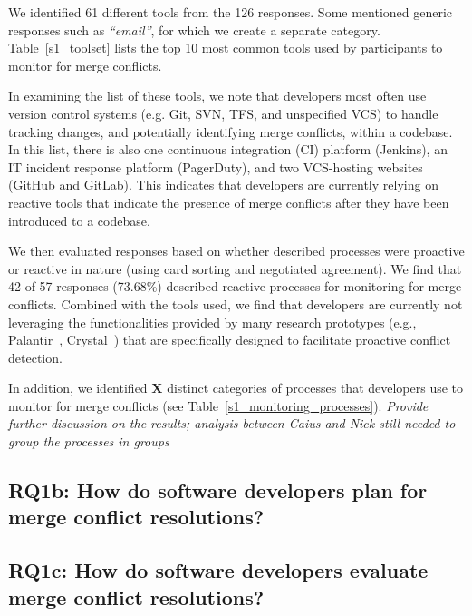 We identified 61 different tools from the 126 responses.
Some mentioned generic responses such as \textit{``email''}, for which we create a separate category.
Table~\ref{s1_toolset} lists the top 10 most common tools used by participants to monitor for merge conflicts.

In examining the list of these tools, we note that developers most often use version control systems (e.g. Git, SVN, TFS, and unspecified VCS) to handle tracking changes, and potentially identifying merge conflicts, within a codebase.
In this list, there is also one continuous integration (CI) platform (Jenkins), an IT incident response platform (PagerDuty), and two VCS-hosting websites (GitHub and GitLab).
This indicates that developers are currently relying on reactive tools that indicate the presence of merge conflicts after they have been introduced to a codebase.

We then evaluated responses based on whether described processes were proactive or reactive in nature (using card sorting and negotiated agreement).
We find that 42 of 57 responses (73.68\%) described reactive processes for monitoring for merge conflicts.
Combined with the tools used, we find that developers are currently not leveraging the functionalities provided by many research prototypes (e.g., Palantir~\cite{palantir}, Crystal~\cite{Brun2011}) that are specifically designed to facilitate proactive conflict detection.

In addition, we identified \textbf{X} distinct categories of processes that developers use to monitor for merge conflicts (see Table~\ref{s1_monitoring_processes}).
 \textit{Provide further discussion on the results; analysis between Caius and Nick still needed to group the processes in groups}

\subsection{\textbf{RQ1b:} How do software developers plan for merge conflict resolutions?}\label{RQ1b}

\subsection{\textbf{RQ1c:} How do software developers evaluate merge conflict resolutions?}\label{RQ1c}